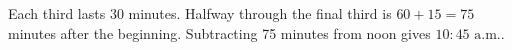 Each third lasts 30 minutes. Halfway through the final third is $60+15=75$ minutes after the beginning. Subtracting 75 minutes from noon gives $\boxed{10{:}45\text{ a.m.}}$.
